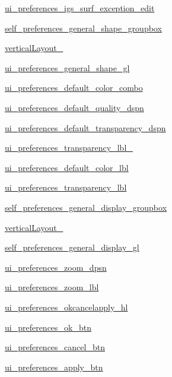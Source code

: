 \begin{DoxyCompactItemize}
\item 
\hyperlink{a00106_a420fe65d048f3d9f4c464f5426f72928}{ui\+\_\+preferences\+\_\+igs\+\_\+surf\+\_\+exception\+\_\+edit}
\item 
\hyperlink{a00106_a58f750a42bbb7ed7e89fe15f5883bf3d}{self\+\_\+preferences\+\_\+general\+\_\+shape\+\_\+groupbox}
\item 
\hyperlink{a00106_a6cf68c068ac0041c158fb99804e4f6b2}{vertical\+Layout\+\_}
\item 
\hyperlink{a00106_a44174aad3cbdfd15fed7998607c98f74}{ui\+\_\+preferences\+\_\+general\+\_\+shape\+\_\+gl}
\item 
\hyperlink{a00106_a0b043ee35d1213137f70620301f00d5f}{ui\+\_\+preferences\+\_\+default\+\_\+color\+\_\+combo}
\item 
\hyperlink{a00106_a018f3104e4bb1e4f93acdb919f43d4a7}{ui\+\_\+preferences\+\_\+default\+\_\+quality\+\_\+dspn}
\item 
\hyperlink{a00106_a87156afaeff8f61b423a3b7cafc07619}{ui\+\_\+preferences\+\_\+default\+\_\+transparency\+\_\+dspn}
\item 
\hyperlink{a00106_af4af1d948631ab4e16506f3dc6ad476d}{ui\+\_\+preferences\+\_\+transparency\+\_\+lbl\+\_}
\item 
\hyperlink{a00106_a2469ae136e448dd1df44686ae61f5f01}{ui\+\_\+preferences\+\_\+default\+\_\+color\+\_\+lbl}
\item 
\hyperlink{a00106_a243905c4e84872947db1bb8dcedadda4}{ui\+\_\+preferences\+\_\+transparency\+\_\+lbl}
\item 
\hyperlink{a00106_a24dafe3bdccfb5c2439cca09d041f8e2}{self\+\_\+preferences\+\_\+general\+\_\+display\+\_\+groupbox}
\item 
\hyperlink{a00106_a770a35129466bdc08cfc70c1a31d74d0}{vertical\+Layout\+\_}
\item 
\hyperlink{a00106_a34e66b85aedb9d531bd13e099c4abd17}{self\+\_\+preferences\+\_\+general\+\_\+display\+\_\+gl}
\item 
\hyperlink{a00106_ab9f4bd205de45a28fb6df5fd10a11e13}{ui\+\_\+preferences\+\_\+zoom\+\_\+dpsn}
\item 
\hyperlink{a00106_a8321ca1cf385acdcd4a23a9aeba71982}{ui\+\_\+preferences\+\_\+zoom\+\_\+lbl}
\item 
\hyperlink{a00106_abeeea5dce817fab1714dcfea02931865}{ui\+\_\+preferences\+\_\+okcancelapply\+\_\+hl}
\item 
\hyperlink{a00106_a191d2ad10ffb160b79b7795e05fe37e3}{ui\+\_\+preferences\+\_\+ok\+\_\+btn}
\item 
\hyperlink{a00106_a47ad79d67a89e77f0cf358171fac15b2}{ui\+\_\+preferences\+\_\+cancel\+\_\+btn}
\item 
\hyperlink{a00106_a3f0de42b6f49c050f03b806cfc7541f7}{ui\+\_\+preferences\+\_\+apply\+\_\+btn}
\end{DoxyCompactItemize}


